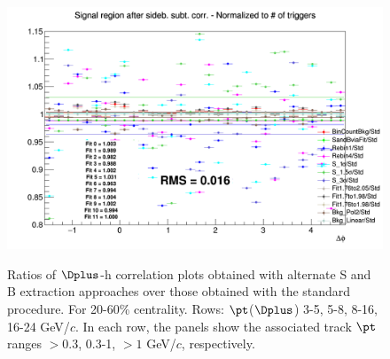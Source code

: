 \begin{figure}
{\includegraphics[width=0.31\linewidth]{Centrality_DPlus/Dplus/Systematic/20_60/Yield/Ratio_AzimCorrDistr_Dplus_Canvas_PtIntBins11to11_PoolInt_thr1dotto99dot.png}} \\
 \caption{Ratios of $\Dplus$-h correlation plots obtained with alternate S and B extraction approaches over those obtained with the standard procedure. For 20-60\% centrality. Rows: $\pt$($\Dplus$) 3-5, 5-8, 8-16, 16-24 GeV/$c$. In each row, the panels show the associated track
$\pt$ ranges $> 0.3$, 0.3-1, $> 1$ GeV/$c$, respectively.}
\label{fig:SysSandB2060_Dplus}
\end{figure}

